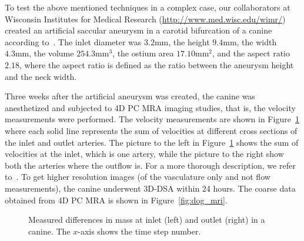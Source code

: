 To test the above mentioned techniques in a complex case, our
collaborators at Wisconsin Institutes for Medical Research
(\url{http://www.med.wisc.edu/wimr/}) created an artificial saccular
aneurysm in a carotid bifurcation of a canine according
to~\cite{german}. The inlet diameter was $3.2 \mathrm{mm}$, the height
$9.4 \mathrm{mm}$, the width $4.3 \mathrm{mm}$, the volume $254.3
\mathrm{mm}^3$, the ostium area $17.10 \mathrm{mm}^2$, and the aspect
ratio $2.18$, where the aspect ratio is defined as the ratio between
the aneurysm height and the neck width.

Three weeks after the artificial aneurysm was created, the canine was
anesthetized and subjected to 4D PC MRA imaging studies, that is, the
velocity measurements were performed. The velocity measurements are
shown in Figure~\ref{fig:mass_dog} where each solid line represents
the sum of velocities at different cross sections of the inlet and
outlet arteries. The picture to the left in Figure~\ref{fig:mass_dog}
shows the sum of velocities at the inlet, which is one artery, while
the picture to the right show both the arteries where the outflow
is. For a more thorough description, we refer to~\cite{doggy}. To get
higher resolution images (of the vasculature only and not flow
measurements), the canine underwent 3D-DSA within 24 hours. The coarse
data obtained from 4D PC MRA is shown in Figure~\ref{fig:dog_mri}.

\begin{figure}
  \begin{center}
  \end{center}
  \caption{Measured differences in mass at inlet (left) and outlet
    (right) in a canine. The $x$-axis shows the time step number.}
  \label{fig:mass_dog}
\end{figure}

